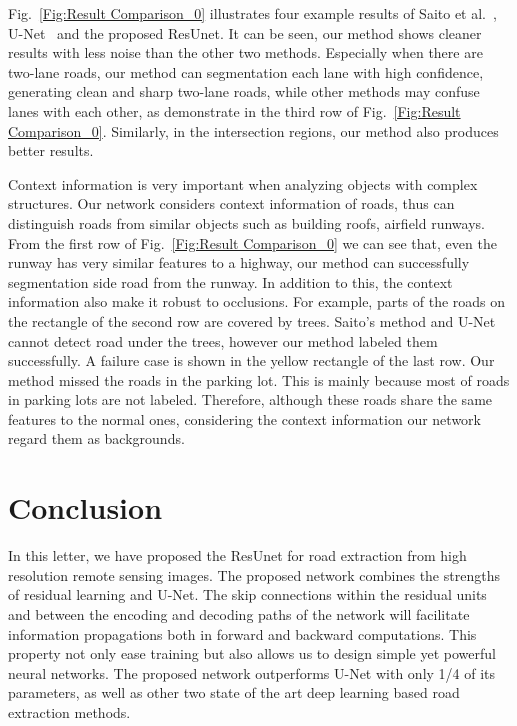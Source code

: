 \documentclass[journal]{IEEEtran}
\begin{document}
Fig.~\ref{Fig:Result Comparison_0} illustrates four example results of Saito et al.~\cite{Saito2016Multiple}, U-Net~\cite{U-NET2015} and the proposed ResUnet. It can be seen, our method shows cleaner results with less noise than the other two methods. Especially when there are two-lane roads, our method can segmentation each lane with high confidence, generating clean and sharp two-lane roads, while other methods may confuse lanes with each other, as demonstrate in the third row of Fig.~\ref{Fig:Result Comparison_0}. Similarly, in the intersection regions, our method also produces better results.

Context information is very important when analyzing objects with complex structures. Our network considers context information of roads, thus can distinguish roads from similar objects such as building roofs, airfield runways. From the first row of Fig.~\ref{Fig:Result Comparison_0} we can see that, even the runway has very similar features to a highway, our method can successfully segmentation side road from the runway. In addition to this, the context information also make it robust to occlusions. For example, parts of the roads on the rectangle of the second row are covered by trees. Saito's method and U-Net cannot detect road under the trees, however our method labeled them successfully. A failure case is shown in the yellow rectangle of the last row. Our method missed the roads in the parking lot. This is mainly because most of roads in parking lots are not labeled. Therefore, although these roads share the same features to the normal ones, considering the context information our network regard them as backgrounds. 


\section{Conclusion}
\label{sec:conslusion}
In this letter, we have proposed the ResUnet for road extraction from high resolution remote sensing images. The proposed network combines the strengths of residual learning and U-Net. The skip connections within the residual units and between the encoding and decoding paths of the network will facilitate information propagations both in forward and backward computations. This property not only ease training but also allows us to design simple yet powerful neural networks. The proposed network outperforms U-Net with only 1/4 of its parameters, as well as other two state of the art deep learning based road extraction methods.
\end{document}

